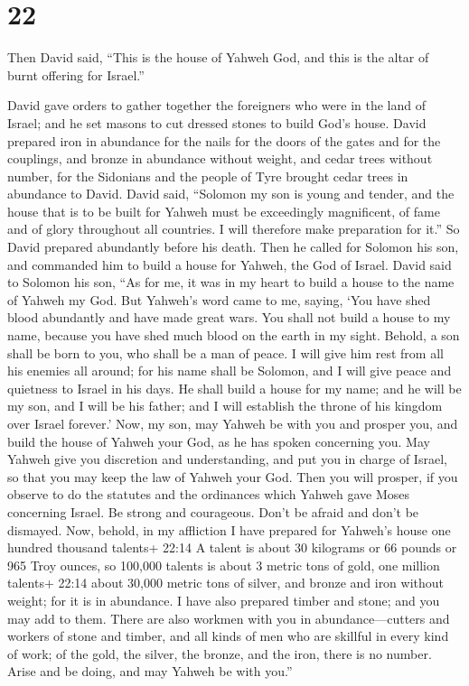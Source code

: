 \hypertarget{section-21}{%
\section{22}\label{section-21}}

 Then David said, ``This is the house of Yahweh God, and
this is the altar of burnt offering for Israel.''

 David gave orders to gather together the foreigners who
were in the land of Israel; and he set masons to cut dressed stones to
build God's house.  David prepared iron in abundance for the
nails for the doors of the gates and for the couplings, and bronze in
abundance without weight,  and cedar trees without number,
for the Sidonians and the people of Tyre brought cedar trees in
abundance to David.  David said, ``Solomon my son is young
and tender, and the house that is to be built for Yahweh must be
exceedingly magnificent, of fame and of glory throughout all countries.
I will therefore make preparation for it.'' So David prepared abundantly
before his death.  Then he called for Solomon his son, and
commanded him to build a house for Yahweh, the God of Israel.
 David said to Solomon his son, ``As for me, it was in my
heart to build a house to the name of Yahweh my God.  But
Yahweh's word came to me, saying, `You have shed blood abundantly and
have made great wars. You shall not build a house to my name, because
you have shed much blood on the earth in my sight.  Behold,
a son shall be born to you, who shall be a man of peace. I will give him
rest from all his enemies all around; for his name shall be Solomon, and
I will give peace and quietness to Israel in his days.  He
shall build a house for my name; and he will be my son, and I will be
his father; and I will establish the throne of his kingdom over Israel
forever.'  Now, my son, may Yahweh be with you and prosper
you, and build the house of Yahweh your God, as he has spoken concerning
you.  May Yahweh give you discretion and understanding, and
put you in charge of Israel, so that you may keep the law of Yahweh your
God.  Then you will prosper, if you observe to do the
statutes and the ordinances which Yahweh gave Moses concerning Israel.
Be strong and courageous. Don't be afraid and don't be dismayed.
 Now, behold, in my affliction I have prepared for Yahweh's
house one hundred thousand talents+ 22:14 A talent is about 30 kilograms
or 66 pounds or 965 Troy ounces, so 100,000 talents is about 3 metric
tons of gold, one million talents+ 22:14 about 30,000 metric tons of
silver, and bronze and iron without weight; for it is in abundance. I
have also prepared timber and stone; and you may add to them.
 There are also workmen with you in abundance---cutters and
workers of stone and timber, and all kinds of men who are skillful in
every kind of work;  of the gold, the silver, the bronze,
and the iron, there is no number. Arise and be doing, and may Yahweh be
with you.''

